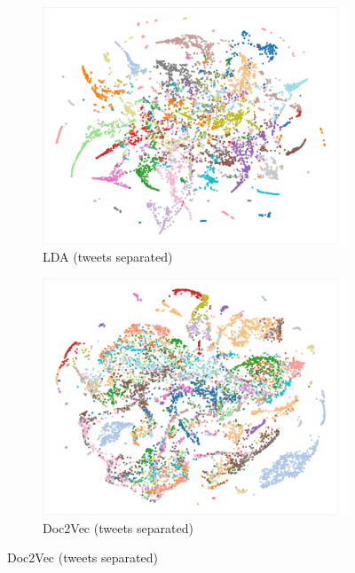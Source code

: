 \documentclass[11pt]{article}
\begin{document}
\begin{figure}[H]
    \centering
    \begin{subfigure}{.49\linewidth}
    \includegraphics[width=\linewidth]{lda_sep}
    \caption{LDA (tweets separated)}\label{fig:res_lda_sep}
    \end{subfigure}
    \begin{subfigure}{.49\linewidth}
    \includegraphics[width=\linewidth]{doc_sep}
    \caption{Doc2Vec (tweets separated)}\label{fig:res_doc_sep}
    \end{subfigure}
    

\end{figure}
\end{document}
